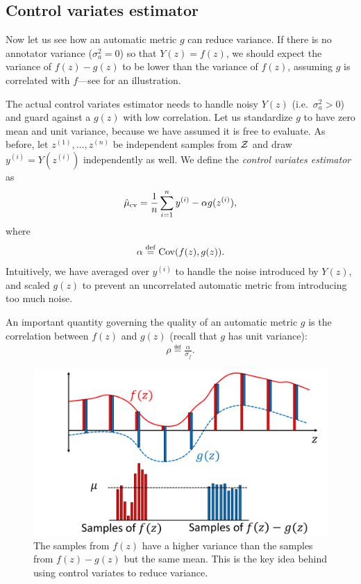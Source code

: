 \subsection{Control variates estimator}

Now let us see how an automatic metric $g$ can reduce variance.
If there is no annotator variance ($\sigma^2_a = 0$) so that $Y(z) = f(z)$,
we should expect the variance of $f(z)-g(z)$ to be lower than the variance of
$f(z)$, assuming $g$ is correlated with $f$---see  for an illustration.

The actual control variates estimator needs to
handle noisy $Y(z)$ (i.e.\ $\sigma^2_a > 0$) and
guard against a $g(z)$ with low correlation.
Let us standardize $g$ to have zero mean and unit variance, because we have
assumed it is free to evaluate.
As before, let $z^{(1)}, \dots, z^{(n)}$ be independent samples from $\mathcal{Z}$ and
draw $y^{(i)} = Y(z^{(i)})$ independently as well.
We define the \emph{control variates estimator} as
\begin{align}
\hat \mu_\text{cv} = \frac{1}{n} \sum_{i=1}^n y^{(i)} - \alpha g(z^{(i)}),
\end{align}
where
\begin{align}
  \alpha \stackrel{\rm def}{=} \operatorname{Cov}(f(z),g(z)).
\end{align}
Intuitively, we have averaged over $y^{(i)}$ to handle the noise introduced by $Y(z)$, and scaled $g(z)$ to prevent an uncorrelated automatic metric from introducing too much noise.

An important quantity governing the quality of an automatic metric $g$
is the correlation between $f(z)$ and $g(z)$ (recall that $g$ has unit variance):
\begin{align}
\rho \eqdef \frac{\alpha}{\sigma_f}.  %
\end{align}

\begin{figure}
\centering
  \includegraphics[width=\columnwidth]{figures/variance_reduction_extreme}
  \caption{\label{fig:variance_reduction}
  The samples from $f(z)$ have a higher variance than the samples
  from $f(z)-g(z)$ but the same mean. This is the key idea behind using control variates to reduce variance.}
\end{figure}

